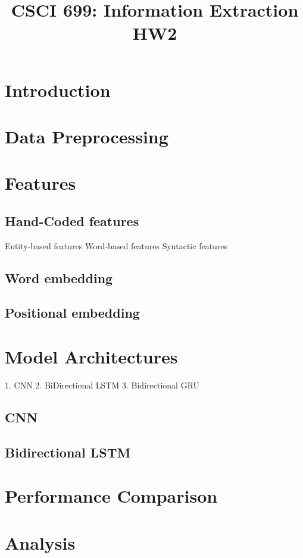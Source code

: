 \documentclass{article}
\begin{document}
\title{CSCI 699: Information Extraction HW2}
\maketitle
\section{Introduction}


\section{Data Preprocessing}

\section{Features}
    \subsection{Hand-Coded features}
    Entity-based features
    Word-based features
    Syntactic features
    
    \subsection{Word embedding}
    
    \subsection{Positional embedding}



\section{Model Architectures}
1. CNN
2. BiDirectional LSTM
3. Bidirectional GRU

    \subsection{CNN}
    \subsection{Bidirectional LSTM}
    \subsection{}

\section{Performance Comparison}

\section{Analysis}
\end{document}
